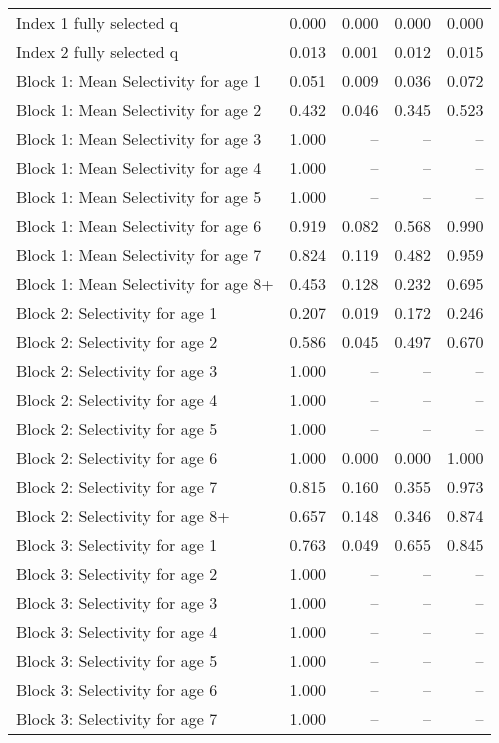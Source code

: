 \documentclass[
]{article}
\begin{document}
\begin{landscape}
\begin{longtable}[t]{lrrrr}
\endfoot
\bottomrule
\endlastfoot
Index 1 fully selected q & 0.000 & 0.000 & 0.000 & 0.000\\
Index 2 fully selected q & 0.013 & 0.001 & 0.012 & 0.015\\
Block 1: Mean Selectivity for age 1 & 0.051 & 0.009 & 0.036 & 0.072\\
Block 1: Mean Selectivity for age 2 & 0.432 & 0.046 & 0.345 & 0.523\\
Block 1: Mean Selectivity for age 3 & 1.000 & -- & -- & --\\
\addlinespace
Block 1: Mean Selectivity for age 4 & 1.000 & -- & -- & --\\
Block 1: Mean Selectivity for age 5 & 1.000 & -- & -- & --\\
Block 1: Mean Selectivity for age 6 & 0.919 & 0.082 & 0.568 & 0.990\\
Block 1: Mean Selectivity for age 7 & 0.824 & 0.119 & 0.482 & 0.959\\
Block 1: Mean Selectivity for age 8+ & 0.453 & 0.128 & 0.232 & 0.695\\
\addlinespace
Block 2: Selectivity for age 1 & 0.207 & 0.019 & 0.172 & 0.246\\
Block 2: Selectivity for age 2 & 0.586 & 0.045 & 0.497 & 0.670\\
Block 2: Selectivity for age 3 & 1.000 & -- & -- & --\\
Block 2: Selectivity for age 4 & 1.000 & -- & -- & --\\
Block 2: Selectivity for age 5 & 1.000 & -- & -- & --\\
\addlinespace
Block 2: Selectivity for age 6 & 1.000 & 0.000 & 0.000 & 1.000\\
Block 2: Selectivity for age 7 & 0.815 & 0.160 & 0.355 & 0.973\\
Block 2: Selectivity for age 8+ & 0.657 & 0.148 & 0.346 & 0.874\\
Block 3: Selectivity for age 1 & 0.763 & 0.049 & 0.655 & 0.845\\
Block 3: Selectivity for age 2 & 1.000 & -- & -- & --\\
\addlinespace
Block 3: Selectivity for age 3 & 1.000 & -- & -- & --\\
Block 3: Selectivity for age 4 & 1.000 & -- & -- & --\\
Block 3: Selectivity for age 5 & 1.000 & -- & -- & --\\
Block 3: Selectivity for age 6 & 1.000 & -- & -- & --\\
Block 3: Selectivity for age 7 & 1.000 & -- & -- & --\\

\end{longtable}
\end{landscape}
\end{document}
